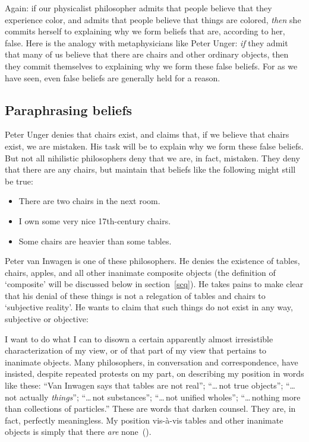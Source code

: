 \documentclass[11pt]{article}
\newenvironment{squote}{%
	\begin{spacing}{1}
	\begin{list}{}{%
	\setlength{\labelwidth}{0pt}%
	\rightmargin\leftmargin%
	}
	\item\relax
	}{%
	\end{list}%
	\end{spacing}
	}
\begin{document}
\begin{spacing}{1.5}
Again: if our physicalist philosopher admits that people believe that
they experience color, and admits that people believe that things are
colored, {\em then} she commits herself to explaining why we form
beliefs that are, according to her, false.  Here is the analogy with
metaphysicians like Peter Unger: {\em if} they admit that many of us
believe that there are chairs and other ordinary objects, then they
commit themselves to explaining why we form these false beliefs.  For
as we have seen, even false beliefs are generally held for a reason.

\subsection{Paraphrasing beliefs}
\label{paraphrase}
Peter Unger denies that chairs exist, and claims that, if we believe
that chairs exist, we are mistaken.  His task will be to explain why
we form these false beliefs.  But not all nihilistic philosophers deny
that we are, in fact, mistaken.  They deny that there are any chairs,
but maintain that beliefs like the following might still be true:

\begin{itemize}
  \item There are two chairs in the next room.
  \item I own some very nice 17th-century chairs.
  \item Some chairs are heavier than some tables.
\end{itemize}

Peter van Inwagen is one of these philosophers.  He denies the
existence of tables, chairs, apples, and all other inanimate composite
objects (the definition of `composite' will be discussed below in
section~\ref{scq}).  He takes pains to make clear that his denial of
these things is not a relegation of tables and chairs to `subjective
reality'.  He wants to claim that such things do not exist in any way,
subjective or objective:
\begin{squote}
I want to do what I can to disown a certain apparently almost
irresistible characterization of my view, or of that part of my view
that pertains to inanimate objects.  Many philosophers, in
conversation and correspondence, have insisted, despite repeated
protests on my part, on describing my position in words like these:
``Van Inwagen says that tables are not real''; ``\ldots\,not true
objects''; ``\ldots\,not actually {\em things}''; ``\ldots\,not
substances''; ``\ldots\,not unified wholes''; ``\ldots\,nothing more
than collections of particles.''  These are words that darken counsel.
They are, in fact, perfectly meaningless.  My position vis-\`{a}-vis
tables and other inanimate objects is simply that there {\em are}
none~(\citeyear[99]{inwagen1995}).
\end{squote}


\end{spacing}
\end{document}
